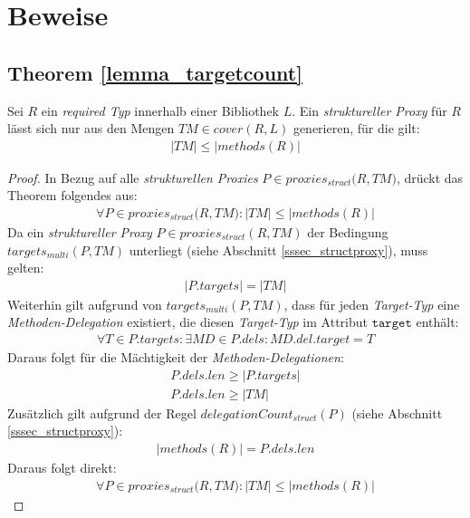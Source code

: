 \chapter{Beweise}\label{app_proofs}
\section*{Theorem \ref{lemma_targetcount}}
\begin{theorem*}
Sei $R$ ein \emph{required Typ} innerhalb einer Bibliothek $L$. 
Ein \emph{struktureller Proxy} für $R$ lässt sich nur aus den Mengen $\mathit{TM} \in \mathit{cover(R,L)}$ generieren, für die gilt:
\begin{gather*}
|\mathit{TM}| \leq |\mathit{methods(R)}|
\end{gather*}
\end{theorem*}
\begin{proof}
In Bezug auf alle \emph{strukturellen Proxies} $P \in \mathit{proxies_{struct}(R,TM})$, drückt das Theorem folgendes aus:
\begin{gather*}
\forall \mathit{P} \in \mathit{proxies_{struct}(R,TM}):|\mathit{TM}| \leq |\mathit{methods(R)}|
\end{gather*}
\noindent
Da ein \emph{struktureller Proxy} $P \in \mathit{proxies_{struct}(R,TM)}$ der Bedingung $\mathit{targets_{multi}(P,TM)}$ unterliegt (siehe Abschnitt \ref{sssec_structproxy}), muss gelten:
\begin{gather*}
|\mathit{P.targets}| = |\mathit{TM}|
\end{gather*}
Weiterhin gilt aufgrund von $\mathit{targets_{multi}(P,TM)}$, dass für jeden \emph{Target-Typ} eine \emph{Methoden-Delegation} existiert, die diesen \emph{Target-Typ} im Attribut $\texttt{target}$ enthält:
\begin{gather*}
\forall \mathit{T} \in \mathit{P.targets}: \exists \mathit{MD} \in \mathit{P.dels}:\mathit{MD.del.target} = T
\end{gather*}
Daraus folgt für die Mächtigkeit der \emph{Methoden-Delegationen}:
\begin{gather*}
\mathit{P.dels.len} \geq |\mathit{P.targets}|\\ \mathit{P.dels.len} \geq |\mathit{TM}|
\end{gather*}
\noindent
Zusätzlich gilt aufgrund der Regel $\mathit{delegationCount_{struct}(P)}$ (siehe Abschnitt \ref{sssec_structproxy}):
\begin{gather*}
|\mathit{methods(R)}| = \mathit{P.dels.len}
\end{gather*}
Daraus folgt direkt:
\begin{gather*}
\forall \mathit{P} \in \mathit{proxies_{struct}(R,TM}):|\mathit{TM}| \leq |\mathit{methods(R)}|
\end{gather*}
\end{proof}

